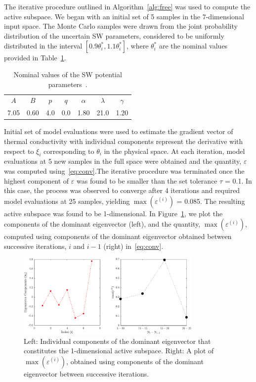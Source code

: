 The iterative procedure outlined in Algorithm~\ref{alg:free} was used to compute the active subspace. 
We began
with an initial set of 5 samples in the 7-dimensional input space. The Monte Carlo samples were drawn
from the joint probability distribution of the uncertain SW parameters, considered
to be uniformly distributed in the interval $[0.9\theta_i^\ast,1.1\theta_i^\ast]$, where $\theta_i^\ast$ are the
nominal values provided in Table~\ref{tab:sw}. 
%
\begin{table}[htbp]
\centering
{}
\begin{tabular}{@{}ccccccc@{}}\toprule
$A$ & $B$ & $p$ & $q$ & $\alpha$ & $\lambda$ & $\gamma$ \\
7.05 & 0.60 & 4.0 & 0.0 & 1.80 & 21.0 & 1.20 \\
\bottomrule
\end{tabular}
\caption{Nominal values of the SW potential parameters~\cite{Stillinger:1985}.}
\label{tab:sw}
\end{table}
%
Initial set of model evaluations were used to estimate the gradient vector of thermal conductivity with
individual components represent the derivative with respect to $\xi_i$ corresponding to $\theta_i$ in
the physical space. At each iteration, model evaluations at 5 new samples in the full space were 
obtained and the quantity, $\varepsilon$ was computed using~\eqref{eq:conv}.The iterative
procedure was terminated once the highest component of $\varepsilon$ was found to be smaller than
the set tolerance $\tau$ = 0.1. In this case, the process was observed to converge after 4 iterations
and required model evaluations at 25 samples, yielding $\max(\varepsilon^{(i)})$ = 0.085.
 The resulting active subspace was found to be
1-dimensional. In Figure~\ref{fig:casfig1}, we plot the components of the dominant eigenvector (left),
and the quantity, $\max(\varepsilon^{(i)})$, computed using components of the dominant eigenvector 
obtained between successive iterations, $i$ and $i-1$ (right) in~\eqref{eq:conv}.
%
\begin{figure}[htbp]
\begin{center}
\includegraphics[width=0.8\textwidth]{./Figures/free_eigv5}
\caption{Left: Individual components of the dominant eigenvector that constitutes the 1-dimensional
active subspace. Right: A plot of $\max(\varepsilon^{(i)})$, obtained
using components of the dominant eigenvector between successive iterations.}
\label{fig:casfig1}
\end{center}
\end{figure}
%

